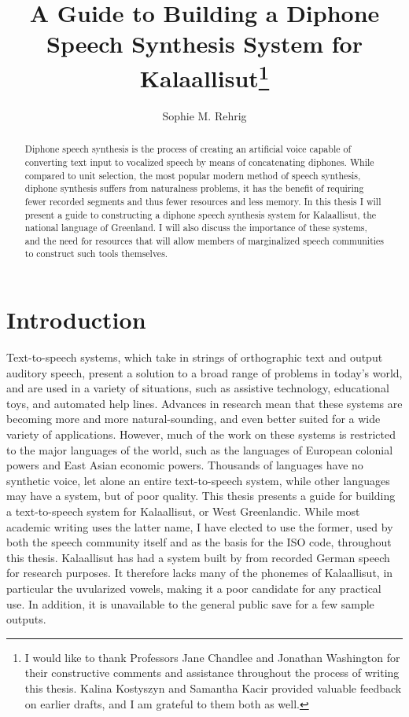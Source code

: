 \documentclass[12pt]{article}
\title{\vspace{-2cm}A Guide to Building a Diphone Speech Synthesis System for Kalaallisut\footnote{I would like to thank Professors Jane Chandlee and Jonathan Washington for their constructive comments and assistance throughout the process of writing this thesis. Kalina Kostyszyn and Samantha Kacir provided valuable feedback on earlier drafts, and I am grateful to them both as well.}}
\author{Sophie M. Rehrig}
\date{{\small\parbox{\linewidth}{\centering
A thesis submitted in partial fulfillment of the requirements for the degree of Bachelor of Arts in Linguistics\endgraf\bigskip
Bryn Mawr College \endgraf
December 2016}}}
\begin{document}
\maketitle
\thispagestyle{empty}

\begin{abstract}
Diphone speech synthesis is the process of creating an artificial voice capable of converting text input to vocalized speech by means of concatenating diphones. While compared to unit selection, the most popular modern method of speech synthesis, diphone synthesis suffers from naturalness problems, it has the benefit of requiring fewer recorded segments and thus fewer resources and less memory. In this thesis I will present a guide to constructing a diphone speech synthesis system for Kalaallisut, the national language of Greenland. I will also discuss the importance of these systems, and the need for resources that will allow members of marginalized speech communities to construct such tools themselves. \par
\end{abstract}

\newpage

\singlespacing
\tableofcontents
\doublespacing

\newpage

\section{Introduction}

Text-to-speech systems, which take in strings of orthographic text and output auditory speech, present a solution to a broad range of problems in today's world, and are used in a variety of situations, such as assistive technology, educational toys, and automated help lines. Advances in research mean that these systems are becoming more and more natural-sounding, and even better suited for a wide variety of applications. However, much of the work on these systems is restricted to the major languages of the world, such as the languages of European colonial powers and East Asian economic powers. Thousands of languages have no synthetic voice, let alone an entire text-to-speech system, while other languages may have a system, but of poor quality. This thesis presents a guide for building a text-to-speech system for Kalaallisut, or West Greenlandic. While most academic writing uses the latter name, I have elected to use the former, used by both the speech community itself and as the basis for the ISO code, throughout this thesis. Kalaallisut has had a system built by \citet{de_speech} from recorded German speech for research purposes. It therefore lacks many of the phonemes of Kalaallisut, in particular the uvularized vowels, making it a poor candidate for any practical use. In addition, it is unavailable to the general public save for a few sample outputs. \par
\end{document}
